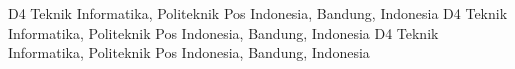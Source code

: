  D4 Teknik Informatika, Politeknik Pos Indonesia, Bandung,
Indonesia
 D4 Teknik Informatika, Politeknik Pos Indonesia, Bandung,
Indonesia
 D4 Teknik Informatika, Politeknik Pos Indonesia, Bandung,
Indonesia